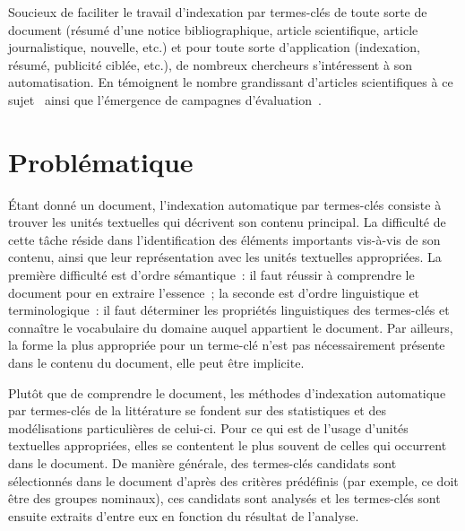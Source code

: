     Soucieux de faciliter le travail d'indexation par termes-clés de toute sorte
    de document (résumé d'une notice bibliographique, article scientifique,
    article journalistique, nouvelle, etc.) et pour toute sorte d'application
    (indexation, résumé, publicité ciblée, etc.), de nombreux chercheurs
    s'intéressent à son automatisation. En témoignent le nombre grandissant
    d'articles scientifiques à ce sujet~\cite{hasan2014state_of_the_art} ainsi
    que l'émergence de campagnes
    d'évaluation~\cite{kim2010semeval,paroubek2012deft}.


  \section{Problématique}
  \label{sec:main-introduction-problem_statement}
    Étant donné un document, l'indexation automatique par termes-clés consiste à
    trouver les unités textuelles qui décrivent son contenu principal. La
    difficulté de cette tâche réside dans l'identification des éléments
    importants vis-à-vis de son contenu, ainsi que leur représentation avec les
    unités textuelles appropriées. La première difficulté est d'ordre
    sémantique~: il faut réussir à comprendre le document pour en extraire
    l'essence~; la seconde est d'ordre linguistique et terminologique~: il faut
    déterminer les propriétés linguistiques des termes-clés et connaître le
    vocabulaire du domaine auquel appartient le document. Par ailleurs, la forme
    la plus appropriée pour un terme-clé n'est pas nécessairement présente dans
    le contenu du document, elle peut être implicite.

    Plutôt que de comprendre le document, les méthodes d'indexation automatique
    par termes-clés de la littérature se fondent sur des statistiques et
    des modélisations particulières de celui-ci. Pour ce qui est de l'usage
    d'unités textuelles appropriées, elles se contentent le plus souvent de
    celles qui occurrent dans le document. De manière générale, des
    termes-clés candidats sont sélectionnés dans le document d'après des
    critères prédéfinis (par exemple, ce doit être des groupes nominaux), ces
    candidats sont analysés et les termes-clés sont ensuite extraits d'entre eux
    en fonction du résultat de l'analyse.

